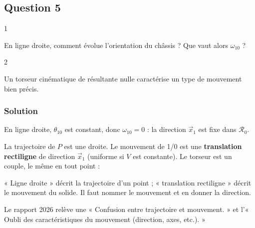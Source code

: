 \documentclass[11pt,a4paper]{article}
\newcommand{\equationajustee}[1]{%
  \sbox{\boiteequation}{$\displaystyle #1$}%
  \ifdim\wd\boiteequation>\linewidth
    \[\resizebox{\linewidth}{!}{\usebox{\boiteequation}}\]%
  \else
    \[#1\]%
  \fi}
\begin{document}
\hypertarget{question-5}{%
\subsection{Question 5}\label{question-5}}

\begin{indication}{1}

En ligne droite, comment évolue l'orientation du châssis ? Que vaut alors \(\omega_{10}\) ?

\end{indication}

\begin{indication}{2}

Un torseur cinématique de résultante nulle caractérise un type de mouvement bien précis.

\end{indication}

\hypertarget{solution-4}{%
\subsubsection{Solution}\label{solution-4}}

En ligne droite, \(\theta_{10}\) est constant, donc \(\omega_{10} = 0\) : la direction \(\vec x_1\) est fixe dans \(\mathcal R_0\).

La trajectoire de \(P\) est une droite. Le mouvement de 1/0 est une \textbf{translation rectiligne} de direction \(\vec x_1\) (uniforme si \(V\) est constante). Le torseur est un couple, le même en tout point :

\equationajustee{\boxed{\{\mathcal V_{1/0}\} = \left\{\begin{matrix}\vec 0\\ V\vec x_1\end{matrix}\right\}_{\forall M}}}

\begin{piege}

« Ligne droite » décrit la trajectoire d'un point ; « translation rectiligne » décrit le mouvement du solide. Il faut nommer le mouvement et en donner la direction.

\end{piege}

\begin{jury}

Le rapport 2026 relève une « Confusion entre trajectoire et mouvement. » et l'« Oubli des caractéristiques du mouvement (direction, axes, etc.). »

\end{jury}
\end{document}
